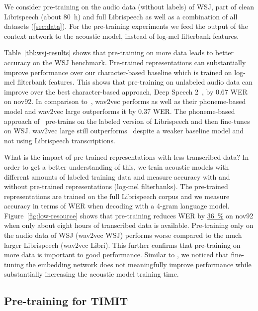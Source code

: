 \documentclass{article} \pdfoutput=1
\newcommand{\wav}{wav2vec}
\newcommand{\wavl}{wav2vec large}
\newcommand{\lowresourceresult}{\hyperref[fig:low-resource]{{\SI{36}{\percent}}}}
\begin{document}
We consider pre-training on the audio data (without labels) of WSJ, part of clean Librispeech (about \SI{80}{\hour}) and full Librispeech as well as a combination of all datasets (\textsection\ref{sec:data}).
For the pre-training experiments we feed the output of the context network to the acoustic model, instead of log-mel filterbank features.

Table~\ref{tbl:wsj-results} shows that pre-training on more data leads to better accuracy on the WSJ benchmark.
Pre-trained representations can substantially improve performance over our character-based baseline which is trained on log-mel filterbank features.
This shows that pre-training on unlabeled audio data can improve over the best character-based approach, Deep Speech 2~\citep{amodei2016deepspeech}, by 0.67 WER on nov92.
In comparison to~\citet{hadian2018interspeech}, \wav{} performs as well as their phoneme-based model and \wavl{} outperforms it by 0.37 WER.
The phoneme-based approach of~\citet{ghahremani2017asru} pre-trains on the labeled version of Librispeech and then fine-tunes on WSJ.
\wavl{} still outperforms~\citet{ghahremani2017asru} despite a weaker baseline model and not using Librispeech transcriptions.

What is the impact of pre-trained representations with less transcribed data?
In order to get a better understanding of this, we train acoustic models with different amounts of labeled training data and measure accuracy with and without pre-trained representations (log-mel filterbanks).
The pre-trained representations are trained on the full Librispeech corpus and we measure accuracy in terms of WER when decoding with a 4-gram language model.
Figure~\ref{fig:low-resource} shows that pre-training reduces WER by \lowresourceresult{} on nov92 when only about eight hours of transcribed data is available.
Pre-training only on the audio data of WSJ (\wav{} WSJ) performs worse compared to the much larger Librispeech (\wav{} Libri).
This further confirms that pre-training on more data is important to good performance.
Similar to \citet{oord2019cpc}, we noticed that fine-tuning the embedding network does not meaningfully improve performance while substantially increasing the acoustic model training time.

\subsection{Pre-training for TIMIT}
\label{sec:res-timit}
\end{document}
